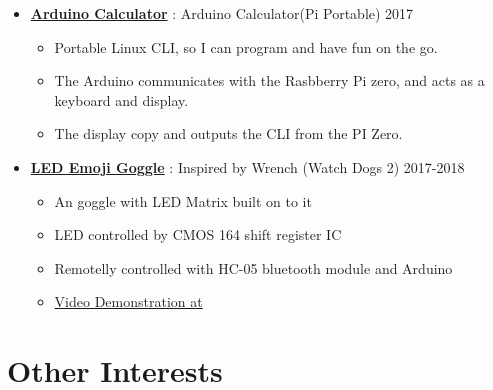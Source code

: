 \begin{itemize}
    \item \href{https://github.com/RustColeone/PiPortable}{\color{link}\textbf{Arduino Calculator}} : Arduino Calculator(Pi Portable)\dashdiv{} 2017

    \begin{itemize}
      \item Portable Linux CLI, so I can program and have fun on the go.
      \item The Arduino communicates with the Rasbberry Pi zero, and acts as a keyboard and display.
      \item The display copy and outputs the CLI from the PI Zero.
    \end{itemize}

    \item \href{https://github.com/RustColeone/LEDEmojiGoggle}{\color{link}\textbf{LED Emoji Goggle}} : Inspired by Wrench (Watch Dogs 2)\dashdiv{} 2017-2018

    \begin{itemize}
      \item An goggle with LED Matrix built on to it
      \item LED controlled by CMOS 164 shift register IC
      \item Remotelly controlled with HC-05 bluetooth module and Arduino
      \item \href{https://www.bilibili.com/video/av33283411/}{\color{link}Video Demonstration at \bilibiliicon{}}
    \end{itemize}

  \end{itemize}

  \section{Other Interests}

